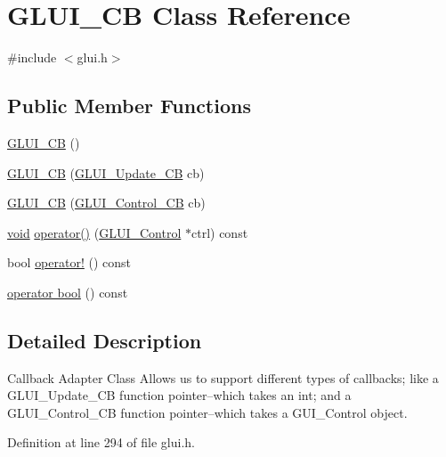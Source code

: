 \hypertarget{class_g_l_u_i___c_b}{\section{G\+L\+U\+I\+\_\+\+C\+B Class Reference}
\label{class_g_l_u_i___c_b}
}


{\ttfamily \#include $<$glui.\+h$>$}

\subsection*{Public Member Functions}
\begin{DoxyCompactItemize}
\item 
\hyperlink{class_g_l_u_i___c_b_a5ff7e75c1425d0e148afa9c461772ae2}{G\+L\+U\+I\+\_\+\+C\+B} ()
\item 
\hyperlink{class_g_l_u_i___c_b_a8ee9a7b49fe15afb89985e2218ac17de}{G\+L\+U\+I\+\_\+\+C\+B} (\hyperlink{glui_8h_a11c8645866aceff55b55af31f4bf4c04}{G\+L\+U\+I\+\_\+\+Update\+\_\+\+C\+B} cb)
\item 
\hyperlink{class_g_l_u_i___c_b_ab2c48ce5142f91878323797b9ea9472c}{G\+L\+U\+I\+\_\+\+C\+B} (\hyperlink{glui_8h_a8dae0ec6ca9738eb013c8add125086d3}{G\+L\+U\+I\+\_\+\+Control\+\_\+\+C\+B} cb)
\item 
\hyperlink{wglext_8h_a9e6b7f1933461ef318bb000d6bd13b83}{void} \hyperlink{class_g_l_u_i___c_b_a3677d6a872540cd82d4ba1add46a16eb}{operator()} (\hyperlink{class_g_l_u_i___control}{G\+L\+U\+I\+\_\+\+Control} $\ast$ctrl) const 
\item 
bool \hyperlink{class_g_l_u_i___c_b_acd93cfbb08c758e75ca38b6caff9131d}{operator!} () const 
\item 
\hyperlink{class_g_l_u_i___c_b_a181c6390f944b9db42de829b83eae7ac}{operator bool} () const 
\end{DoxyCompactItemize}


\subsection{Detailed Description}
Callback Adapter Class Allows us to support different types of callbacks; like a G\+L\+U\+I\+\_\+\+Update\+\_\+\+C\+B function pointer--which takes an int; and a G\+L\+U\+I\+\_\+\+Control\+\_\+\+C\+B function pointer--which takes a G\+U\+I\+\_\+\+Control object. 

Definition at line 294 of file glui.\+h.



